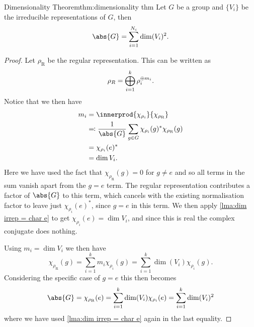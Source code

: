 \begin{thm}{Dimensionality Theorem}{thm:dimensionality thm}
    Let \(G\) be a group and \(\{V_i\}\) be the irreducible representations
    of \(G\), then
    \begin{equation}
        \abs{G} = \sum_{i = 1}^{N_{\mathrm{c}}} \dim(V_i)^2.
    \end{equation}
    \begin{proof}
        Let \(\rho_{\mathrm{R}}\) be the regular representation.
        This can be written as
        \begin{equation}
            \rho_R = \bigoplus_{i = 1}^{k} \rho_i^{\oplus m_i}.
        \end{equation}
        Notice that we then have
        \begin{align}
            m_i &= \innerprod{\chi_{\rho_i}}{\chi_{\rho_{\mathrm{R}}}}\\
            &\eqqcolon \frac{1}{\abs{G}} \sum_{g \in G} \chi_{\rho_i}(g)^*
            \chi_{\rho_{\mathrm{R}}}(g)\\
            &= \chi_{\rho_i}(e)^*\\
            &= \dim V_i.
        \end{align}
        Here we have used the fact that \(\chi_{\rho_{\mathrm{R}}}(g) = 0\)
        for \(g \ne e\) and so all terms in the sum vanish apart from the \(g = e\)
        term.
        The regular representation contributes a factor of \(\abs{G}\) to
        this term, which cancels with the existing normalisation factor to leave just
        \(\chi_{\rho_i}(e)^*\), since \(g = e\) in this term.
        We then apply \cref{lma:dim irrep = char e} to get
        \(\chi_{\rho_i}(e) = \dim V_i\), and since this is real the complex conjugate
        does nothing.
        
        Using \(m_i = \dim V_i\) we then have
        \begin{equation}
            \chi_{\rho_{\mathrm{R}}}(g) = \sum_{i = 1}^{k} m_i
            \chi_{\rho_i}(g) = \sum_{i = 1}^{k} \dim(V_i) \chi_{\rho_i}(g).
        \end{equation}
        Considering the specific case of \(g = e\) this then becomes
        \begin{equation}
            \abs{G} = \chi_{\rho_{\mathrm{R}}}(e) = \sum_{i = 1}^{k}
            \dim(V_i) \chi_{\rho_i}(e) = \sum_{i = 1}^{k} \dim(V_i)^2
        \end{equation}
        where we have used \cref{lma:dim irrep = char e} again in the last
        equality.
    \end{proof}
\end{thm}

